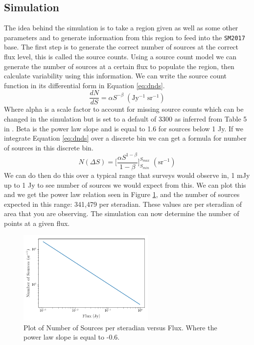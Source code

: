 \documentclass[a4paper, 10pt]{article}
\begin{document}
\subsection{Simulation}
The idea behind the simulation is to take a region given as well as some other parameters and to generate information from this region to feed into the \texttt{SM2017} base. The first step is to generate the correct number of sources at the correct flux level, this is called the source counts. Using a source count model we can generate the number of sources at a certain flux to populate the region, then calculate variability using this information. We can write the source count function in its differential form in Equation \ref{eq:dnds}.
\begin{equation}\label{eq:dnds}
    \dfrac{dN}{dS}= \alpha S^{-\beta} \; \mathrm{(Jy^{-1} \; sr^{-1})}
\end{equation}
Where alpha is a scale factor to account for missing source counts which can be changed in the simulation but is set to a default of 3300 as inferred from Table 5 in \citet{Intema}. Beta is the power law slope and is equal to 1.6 for sources below 1 Jy. If we integrate Equation \ref{eq:dnds} over a discrete bin we can get a formula for number of sources in this discrete bin.
\begin{equation}\label{eq:NS}
    N(\Delta S)= \bigg[\dfrac{\alpha S^{1-\beta}}{1-\beta}\bigg]^{S_{max}}_{S_{min}} \; \mathrm{(sr^{-1})}
\end{equation}
We can do then do this over a typical range that surveys would observe in, 1 mJy up to 1 Jy to see number of sources we would expect from this. We can plot this and we get the power law relation seen in Figure \ref{fig:LNLS}, and the number of sources expected in this range: 341,479 per steradian. These values are per steradian of area that you are observing. The simulation can now determine the number of points at a given flux.
\begin{figure}[H]

\begin{center}
  \includegraphics[width=0.6\textwidth]{dnds.png}
  \caption{Plot of Number of Sources per steradian versus Flux. Where the power law slope is equal to -0.6. }
  \label{fig:LNLS}
\end{center}
\end{figure}
\end{document}
